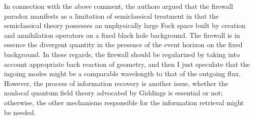 \documentclass[aps,a4paper,showpacs,showkeys,superscriptaddress,12pt]{revtex4-1}
\begin{document}
In connection with the above comment,
the authors \cite{Nomura:2016qum} argued that the firewall paradox manifests as a limitation of semiclassical treatment
in that the semiclassical theory possesses an unphysically large Fock space
built by creation and annihilation operators on a fixed black hole background.
The firewall is in essence the divergent quantity in the presence of the event horizon
on the fixed background. In these regards, the firewall should be regularized
by taking into account appropriate back reaction of geometry, and then
I just speculate that the ingoing modes might be a comparable wavelength to that of the outgoing flux.
However, the process of information recovery is another issue,
whether the nonlocal quantum field theory advocated by Giddings \cite{Giddings:2013kcj}  is essential or not;
otherwise, the other mechanisms responsible for the information retrieval might be needed.
\end{document}
